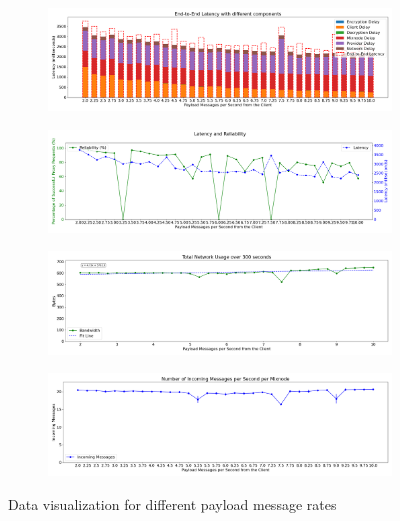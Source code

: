 \documentclass[a4paper,11pt,oneside]{report}
\begin{document}
\begin{figure}[htbp]
    \centering
    \begin{subfigure}{\textwidth}
        \centering
        \includegraphics[width=\textwidth]{plots/lambdas_latency_components.png}
        \caption{}
        \label{fig:lambdas_latency}
    \end{subfigure}
    \hfill
    \centering
    \begin{subfigure}{\textwidth}
        \centering
        \includegraphics[width=\textwidth]{plots/lambdas_reliability_latency.png}
        \caption{}
        \label{fig:lambdas_realibility}
    \end{subfigure}
    \hfill
    \begin{subfigure}{\textwidth}
        \centering
        \includegraphics[width=\textwidth]{plots/lambdas_bandwidth.png}
        \caption{}
        \label{fig:lambdas_bandwidth}
    \end{subfigure}
    \hfill
    \begin{subfigure}{\textwidth}
        \centering
        \includegraphics[width=\textwidth]{plots/lambdas_incoming_messages.png}
        \caption{}
        \label{fig:lambdas_messages}
    \end{subfigure}
    \caption{Data visualization for different payload message rates}
\end{figure}
\end{document}
